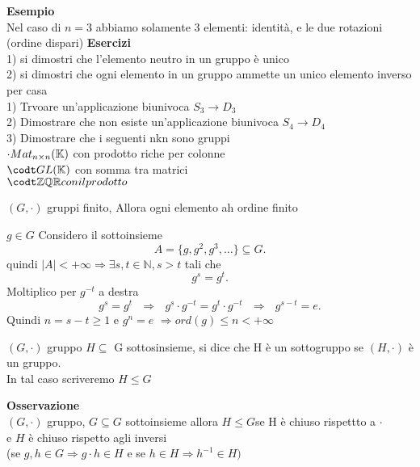 \documentclass[12px]{article}
\begin{document}
{\begin{defi}
\end{defi}
\textbf{Esempio}\\
Nel caso di $n = 3$ abbiamo solamente 3 elementi: identità, e le due rotazioni (ordine dispari)
\textbf{Esercizi}\\
1) si dimostri che l'elemento neutro in un gruppo è unico\\
2) si dimostri che ogni elemento in un gruppo ammette un unico elemento inverso\\
per casa\\
1) Trvoare un'applicazione biunivoca $S_3 \rightarrow D_3$\\
2) Dimostrare che non esiste un'applicazione biunivoca $S_4 \rightarrow D_4$\\
3) Dimostrare che i seguenti nkn sono gruppi\\
$\cdot Mat_{n\times n} (\mathbb{K})$ con prodotto riche per colonne\\
 $\codt GL(\K)$ con somma tra matrici\\
 $\codt \mathbb Z \mathbb Q \R con il prodotto$\\
  \begin{prop}
	  $(G, \cdot)$ gruppi finito, Allora ogni elemento ah ordine finito
 \end{prop}
 \begin{dimo}
 	$g\in G$ Considero il sottoinsieme
	 \[
	A = \lbrace g, g^2, g^3, \ldots\rbrace\subseteq G
	.\] 
	quindi $|A|<+\infty \Rightarrow \exists s,t\in \mathbb N, s> t$  tali che \[
	g^s = g^t
	.\] 
	Moltiplico per $g^{-t}$ a destra
	\[
		g^s = g^t \ \ \ \Rightarrow  \ \ \ g^s\cdot g^{-t} = g^t\cdot g^{-t} \ \ \ \Rightarrow \ \ \ g^{s-t} = e
	.\] 
	Quindi $n = s-t\geq 1$ e $g^n = e $ $ \Rightarrow ord(g) \leq n < +\infty $
 \end{dimo}
 \begin{defi}[Sottogruppo]
 	$(G, \cdot)$ gruppo $H\subseteq$ G sottosinsieme, si dice che H è un sottogruppo se $(H,\cdot)$ è un gruppo.\\
	In tal caso scriveremo $H \leq G$
 \end{defi}
 \textbf{Osservazione}\\
 $(G,\cdot)$ gruppo,  $G\subseteq G$ sottoinsieme allora  $H\leq G$se H è chiuso rispettto a $\cdot$ \\e  $H$ è chiuso rispetto agli inversi \\(se  $g, h\in G \Rightarrow g\cdot h\in H$ e se $h\in H \Rightarrow h^{-1}\in H)$

}
\end{document}
